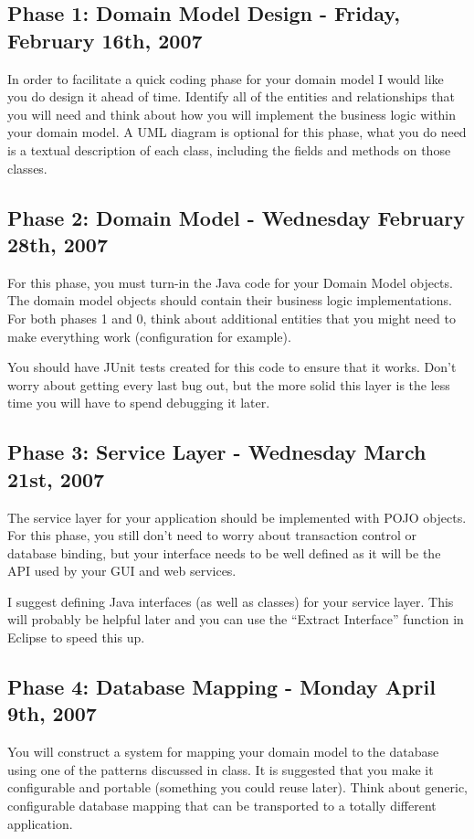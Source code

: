 \documentclass[11pt]{exam}
\begin{document}
\subsection{Phase 1: Domain Model Design - Friday, February 16th, 2007}
In order to facilitate a quick coding phase for your domain model I would like you do design it ahead of time.   Identify all of the entities and relationships that you will need and think about how you will implement the business logic within your domain model.   A UML diagram is optional for this phase, what you do need is a textual description of each class, including the fields and methods on those classes.

\subsection{Phase 2: Domain Model - Wednesday February 28th, 2007}
For this phase, you must turn-in the Java code for your Domain Model objects.   The domain model objects should contain their business logic implementations.   For both phases 1 and 0, think about additional entities that you might need to make everything work (configuration for example).
\par
You should have JUnit tests created for this code to ensure that it works.   Don't worry about getting every last bug out, but the more solid this layer is the less time you will have to spend debugging it later.  

\subsection{Phase 3: Service Layer - Wednesday March 21st, 2007 }
The service layer for your application should be implemented with POJO objects.   For this phase, you still don't need to worry about transaction control or database binding, but your interface needs to be well defined as it will be the API used by your GUI and web services.
\par
I suggest defining Java interfaces (as well as classes) for your service layer.   This will probably be helpful later and you can use the ``Extract Interface'' function in Eclipse to speed this up.

\subsection{Phase 4: Database Mapping - Monday April 9th, 2007 }
You will construct a system for mapping your domain model to the database using one of the patterns discussed in class.   It is suggested that you make it configurable and portable (something you could reuse later).   Think about generic, configurable database mapping that can be transported to a totally different application.
\end{document}
